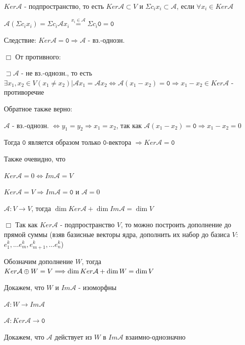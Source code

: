 \documentclass[12pt]{article}
\begin{document}
    $Ker \mathcal{A}$ - подпространство, то есть $Ker \mathcal{A} \subset V$ и
    $\displaystyle \Sigma c_i x_i \subset \mathcal{A}$, если $\displaystyle \forall x_i \in Ker \mathcal{A}$

    $\displaystyle \mathcal{A} (\Sigma c_i x_i) = \Sigma c_i \mathcal{A} x_i \stackrel{x_i \in \mathcal{A}}{=} \Sigma c_i \texttt{0} = \texttt{0}$

    Следствие: $Ker \mathcal{A} = \texttt{0} \Longrightarrow \mathcal{A}$ - вз.-однозн.

    $\Box$ От противного:

    $\sqsupset \mathcal{A}$ - не вз.-однозн., то есть $\displaystyle \exists x_1, x_2 \in V (x_1 \neq x_2) | \mathcal{A}x_1 = \mathcal{A}x_2 \Longleftrightarrow \mathcal{A} (x_1 - x_2) = \texttt{0} \Longrightarrow x_1 - x_2 \in Ker \mathcal{A}$ - противоречие

    \Nota Обратное также верно:

    $\mathcal{A}$ - вз.-однозн. $\displaystyle \Longleftrightarrow y_1 = y_2 \Longrightarrow x_1 = x_2$, так как $\displaystyle \mathcal{A}(x_1 - x_2) = \texttt{0} \Longrightarrow x_1 - x_2 = 0$

    Тогда $\texttt{0}$ является образом только $\texttt{0}$-вектора $\Longrightarrow Ker \mathcal{A} = \texttt{0}$

    \Nota Также очевидно, что

    $Ker \mathcal{A} = 0 \Longleftrightarrow Im \mathcal{A} = V$

    $Ker \mathcal{A} = V \Longrightarrow Im \mathcal{A} = \texttt{0}$ и $\mathcal{A} = 0$

    \Th $\mathcal{A} : V \rightarrow V$, тогда $\dim Ker \mathcal{A} + \dim Im \mathcal{A} = \dim V$

    $\Box$ Так как $Ker \mathcal{A}$ - подпространство $V$, то можно построить дополнение до прямой суммы (взяв базисные векторы ядра, дополнить их набор до базиса $V$: $\displaystyle e^k_1, \dots e^k_m, e^k_{m+1}, \dots e^k_n$)

    Обозначим дополнение $W$, тогда $Ker \mathcal{A} \oplus W = V \Longrightarrow \dim Ker \mathcal{A} + \dim W = \dim V$

    Докажем, что $W$ и $Im \mathcal{A}$ - изоморфны

    $\mathcal{A} : W \rightarrow Im \mathcal{A}$

    $\mathcal{A} : Ker \mathcal{A} \rightarrow \texttt{0}$

    Докажем, что $\mathcal{A}$ действует из $W$ в $Im \mathcal{A}$ взаимно-однозначно
\end{document}

